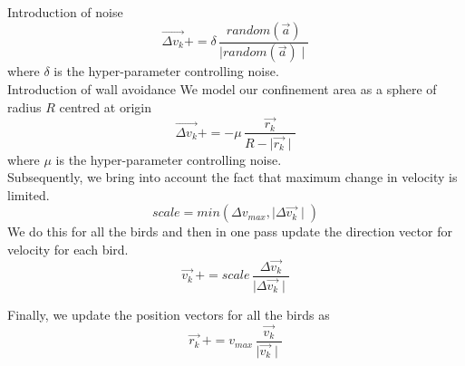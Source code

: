 \documentclass[a4paper,12pt,openany]{book}
\begin{document}
\noindent Introduction of noise 
\begin{equation}
	\vec{\Delta v_k} += \delta \, \frac{random(\vec{a}) }{\mid random(\vec{a}) \mid}
\end{equation}
where $\delta$ is the hyper-parameter controlling noise.\\

\noindent Introduction of wall avoidance
We model our confinement area as a sphere of radius $R$ centred at origin
\begin{equation}
	\vec{\Delta v_k} += -\mu \, \frac{\vec{r_k}}{R - \mid \vec{r_k} \mid}
\end{equation}
where $\mu$ is the hyper-parameter controlling noise.\\

Subsequently, we bring into account the fact that maximum change in velocity is limited.\\
\begin{equation}
	scale = min(\Delta v_{max} , \mid \Delta \vec{v_k} \mid)
\end{equation}
We do this for all the birds and then in one pass update the direction vector for velocity for each bird.
\begin{equation}
	\vec{v_k} \,+=  scale \, \frac{\Delta \vec{v_k}}{\mid \Delta \vec{v_k}\mid}
\end{equation}

\noindent Finally, we update the position vectors for all the birds as
\begin{equation}
	\vec{r_k} \,+=  v_{max} \, \frac{\vec{v_k}}{\mid \vec{v_k}\mid}
\end{equation}
\end{document}
